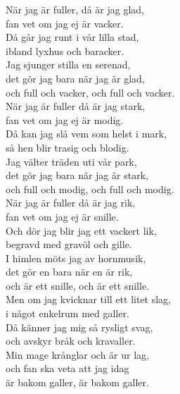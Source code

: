 \documentclass[a6paper, 10pt, twoside]{article}
\begin{document}
\newpage
\noindent
\begin{center}
\end{center}
\begin{lyrics}
När jag är fuller, då är jag glad, \\
fan vet om jag ej är vacker. \\
Då går jag runt i vår lilla stad, \\
ibland lyxhus och baracker. \\
Jag sjunger stilla en serenad, \\
det gör jag bara när jag är glad, \\
och full och vacker, och full och vacker. 
\vspace{5pt}\\
När jag är fuller då är jag stark, \\
fan vet om jag ej är modig. \\
Då kan jag slå vem som helst i mark, \\
så hen blir trasig och blodig. \\
Jag välter träden uti vår park, \\
det gör jag bara när jag är stark, \\
och full och modig, och full och modig. 
\vspace{5pt}\\
När jag är fuller då är jag rik, \\
fan vet om jag ej är snille. \\
Och dör jag blir jag ett vackert lik, \\
begravd med gravöl och gille. \\
I himlen möts jag av hornmusik, \\
det gör en bara när en är rik, \\
och är ett snille, och är ett snille.
\vspace{5pt}\\
Men om jag kvicknar till ett litet slag, \\
i något enkelrum med galler. \\
Då känner jag mig så rysligt svag, \\
och avskyr bråk och kravaller. \\
Min mage krånglar och är ur lag, \\
och fan ska veta att jag idag \\
är bakom galler, är bakom galler. 
\end{lyrics}
\end{document}
